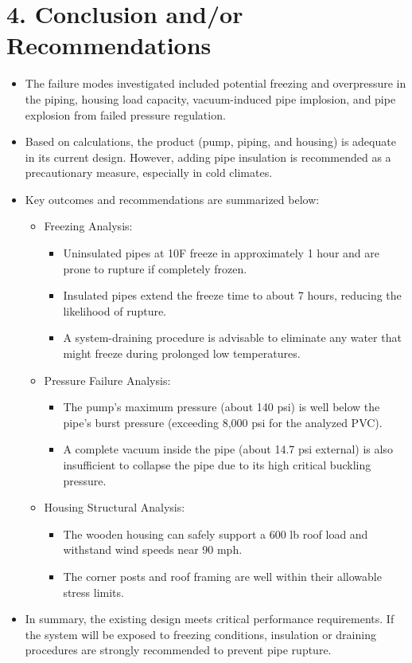 \documentclass[12pt]{article}
\begin{document}
\newpage

\section*{4. Conclusion and/or Recommendations}

\begin{itemize}
    \item The failure modes investigated included potential freezing and overpressure in the piping, housing load capacity, vacuum-induced pipe implosion, and pipe explosion from failed pressure regulation.
    \item Based on calculations, the product (pump, piping, and housing) is adequate in its current design. However, adding pipe insulation is recommended as a precautionary measure, especially in cold climates.
    \item Key outcomes and recommendations are summarized below:
    \begin{itemize}
        \item Freezing Analysis:
        \begin{itemize}
            \item Uninsulated pipes at 10\textdegree F freeze in approximately 1 hour and are prone to rupture if completely frozen.
            \item Insulated pipes extend the freeze time to about 7 hours, reducing the likelihood of rupture.
            \item A system-draining procedure is advisable to eliminate any water that might freeze during prolonged low temperatures.
        \end{itemize}
        \item Pressure Failure Analysis:
        \begin{itemize}
            \item The pump’s maximum pressure (about 140 psi) is well below the pipe’s burst pressure (exceeding 8,000 psi for the analyzed PVC).
            \item A complete vacuum inside the pipe (about 14.7 psi external) is also insufficient to collapse the pipe due to its high critical buckling pressure.
        \end{itemize}
        \item Housing Structural Analysis:
        \begin{itemize}
            \item The wooden housing can safely support a 600 lb roof load and withstand wind speeds near 90 mph.
            \item The corner posts and roof framing are well within their allowable stress limits.
        \end{itemize}
    \end{itemize}
    \item In summary, the existing design meets critical performance requirements. If the system will be exposed to freezing conditions, insulation or draining procedures are strongly recommended to prevent pipe rupture.
\end{itemize}
\end{document}
